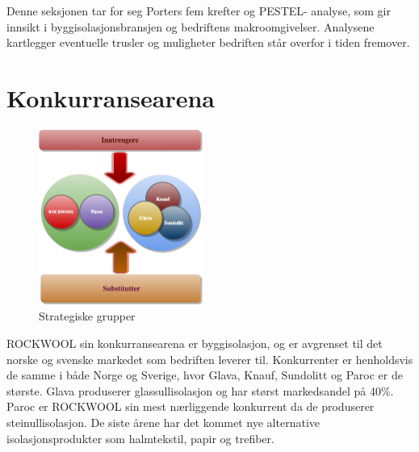 Denne seksjonen tar for seg Porters fem krefter og PESTEL- analyse, som gir innsikt i byggisolasjonsbransjen og bedriftens makroomgivelser. Analysene kartlegger eventuelle trusler og muligheter bedriften står overfor i tiden fremover.

\section{Konkurransearena}
\begin{figure}
  \begin{center}
    \includegraphics[width=0.48\textwidth, scale=0.2]{bilder/strategiskeGrupper.png}
  \end{center}
  \caption{Strategiske grupper}
  \label{fig:strategiskeGrupper}
\end{figure}

\indent \newline
ROCKWOOL sin konkurransearena er byggisolasjon, og er avgrenset til det norske og svenske markedet som bedriften leverer til.  Konkurrenter er henholdsvis de samme i både Norge og Sverige, hvor Glava, Knauf, Sundolitt og Paroc er de største. Glava produserer glassullisolasjon og har størst markedsandel på 40\%. Paroc er ROCKWOOL sin mest nærliggende konkurrent da de produserer steinullisolasjon. De siste årene har det kommet nye alternative isolasjonsprodukter som halmtekstil, papir og trefiber.

